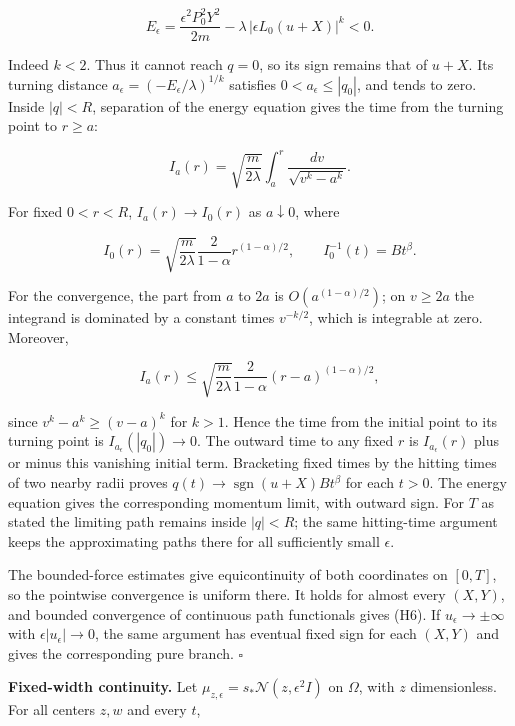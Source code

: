 \documentclass[11pt,a4paper]{article}
\begin{document}
\[
 E_\epsilon=\frac{\epsilon^2P_0^2Y^2}{2m}
            -\lambda\,|\epsilon L_0(u+X)|^k<0. \tag{H7}
\]

Indeed \(k<2\). Thus it cannot reach \(q=0\), so its sign remains that
of \(u+X\). Its turning distance
\(a_\epsilon=(-E_\epsilon/\lambda)^{1/k}\) satisfies
\(0<a_\epsilon\le|q_0|\), and tends to zero. Inside \(|q|<R\),
separation of the energy equation gives the time from the turning point
to \(r\ge a\):

\[
 I_a(r)=\sqrt{\frac{m}{2\lambda}}\int_a^r
              \frac{dv}{\sqrt{v^k-a^k}}. \tag{H8}
\]

For fixed \(0<r<R\), \(I_a(r)\to I_0(r)\) as \(a\downarrow0\), where

\[
 I_0(r)=\sqrt{\frac{m}{2\lambda}}\frac{2}{1-\alpha}
                    r^{(1-\alpha)/2},\qquad I_0^{-1}(t)=Bt^\beta.
 \tag{H9}
\]

For the convergence, the part from \(a\) to \(2a\) is
\(O(a^{(1-\alpha)/2})\); on \(v\ge2a\) the integrand is dominated by a
constant times \(v^{-k/2}\), which is integrable at zero. Moreover,

\[
 I_a(r)\le \sqrt{\frac{m}{2\lambda}}\frac{2}{1-\alpha}
                 (r-a)^{(1-\alpha)/2}, \tag{H10}
\]

since \(v^k-a^k\ge(v-a)^k\) for \(k>1\). Hence the time from the initial
point to its turning point is \(I_{a_\epsilon}(|q_0|)\to0\). The outward
time to any fixed \(r\) is \(I_{a_\epsilon}(r)\) plus or minus this
vanishing initial term. Bracketing fixed times by the hitting times of
two nearby radii proves \(q(t)\to\operatorname{sgn}(u+X)Bt^\beta\) for
each \(t>0\). The energy equation gives the corresponding momentum
limit, with outward sign. For \(T\) as stated the limiting path remains
inside \(|q|<R\); the same hitting-time argument keeps the approximating
paths there for all sufficiently small \(\epsilon\).

The bounded-force estimates give equicontinuity of both coordinates on
\([0,T]\), so the pointwise convergence is uniform there. It holds for
almost every \((X,Y)\), and bounded convergence of continuous path
functionals gives (H6). If \(u_\epsilon\to\pm\infty\) with
\(\epsilon|u_\epsilon|\to0\), the same argument has eventual fixed sign
for each \((X,Y)\) and gives the corresponding pure branch. \(\square\)

\textbf{Fixed-width continuity.} Let
\(\mu_{z,\epsilon}=s_*\mathcal N(z,\epsilon^2I)\) on \(\Omega\), with
\(z\) dimensionless. For all centers \(z,w\) and every \(t\),
\end{document}
